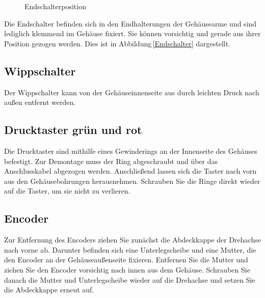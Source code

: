 \begin{figure}[H]

\caption{Endschalterposition}
\label{tikz:Endschalter}
\end{figure}

Die Endschalter befinden sich in den Endhalterungen der Gehäusearme und sind lediglich klemmend im Gehäuse fixiert. Sie können vorsichtig und gerade aus ihrer Position gezogen werden. Dies ist in Abbildung \ref{Endschalter} dargestellt.

\subsection{Wippschalter}
Der Wippschalter kann von der Gehäuseinnenseite aus durch leichten Druck nach außen entfernt werden.

\subsection{Drucktaster grün und rot}
Die Drucktaster sind mithilfe eines Gewinderings an der Innenseite des Gehäuses befestigt. Zur Demontage muss der Ring abgeschraubt und über das Anschlusskabel abgezogen werden. Anschließend lassen sich die Taster nach vorn aus den Gehäusebohrungen herausnehmen. Schrauben Sie die Ringe direkt wieder auf die Taster, um sie nicht zu verlieren.

\subsection{Encoder}
Zur Entfernung des Encoders ziehen Sie zunächst die Abdeckkappe der Drehachse nach vorne ab. Darunter befinden sich eine Unterlegscheibe und eine Mutter, die den Encoder an der Gehäuseaußenseite fixieren. Entfernen Sie die Mutter und ziehen Sie den Encoder vorsichtig nach innen aus dem Gehäuse. Schrauben Sie danach die Mutter und Unterlegscheibe wieder auf die Drehachse und setzen Sie die Abdeckkappe erneut auf.

